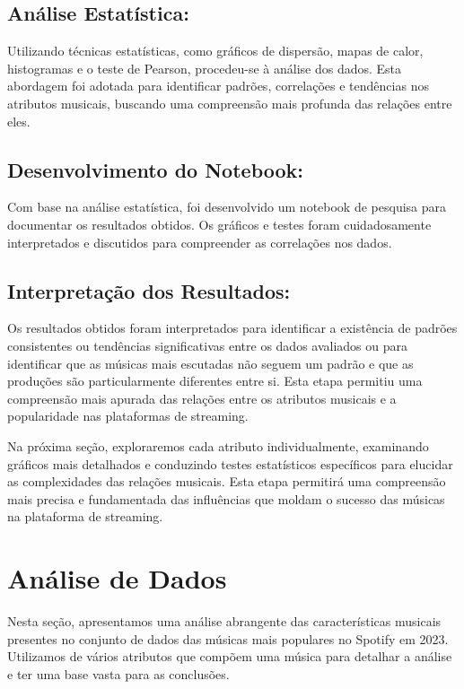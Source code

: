 \documentclass[12pt]{article}
\begin{document}
\subsection{Análise Estatística:}
Utilizando técnicas estatísticas, como gráficos de dispersão, mapas de calor, histogramas e o teste de Pearson, procedeu-se à análise dos dados. Esta abordagem foi adotada para identificar padrões, correlações e tendências nos atributos musicais, buscando uma compreensão mais profunda das relações entre eles.

\subsection{Desenvolvimento do Notebook:}
Com base na análise estatística, foi desenvolvido um notebook de pesquisa para documentar os resultados obtidos. Os gráficos e testes foram cuidadosamente interpretados e discutidos para compreender as correlações nos dados.

\subsection{Interpretação dos Resultados:}
Os resultados obtidos foram interpretados para identificar a existência de padrões consistentes ou tendências significativas entre os dados avaliados ou para identificar que as músicas mais escutadas não seguem um padrão e que as produções são particularmente diferentes entre si. Esta etapa permitiu uma compreensão mais apurada das relações entre os atributos musicais e a popularidade nas plataformas de streaming.

Na próxima seção, exploraremos cada atributo individualmente, examinando gráficos mais detalhados e conduzindo testes estatísticos específicos para elucidar as complexidades das relações musicais. Esta etapa permitirá uma compreensão mais precisa e fundamentada das influências que moldam o sucesso das músicas na plataforma de streaming.



\section{Análise de Dados}

Nesta seção, apresentamos uma análise abrangente das características musicais presentes no conjunto de dados das músicas mais populares no Spotify em 2023. Utilizamos de vários atributos que compõem uma música para detalhar a análise e ter uma base vasta para as conclusões. 
\end{document}
